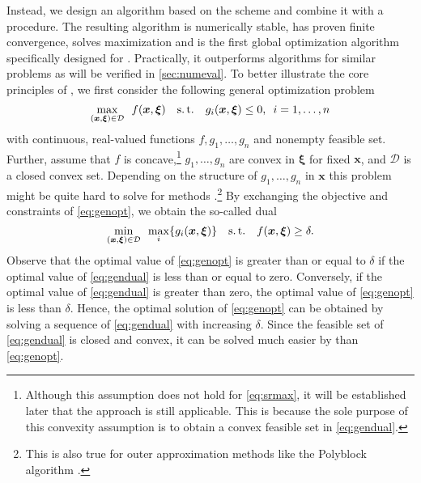 \documentclass[a4paper,10pt,journal]{IEEEtran}
\newcommand{\st}{\mathrm{s.\,t.}}
\let\vec\bm
\begin{document}
Instead, we design an algorithm based on the  scheme \cite{Tuy2005a,Tuy2009,sit,diss} and combine it with a  procedure. The resulting algorithm is numerically stable, has proven finite convergence, solves  maximization and is the first global optimization algorithm specifically designed for . Practically, it outperforms algorithms for similar problems as will be verified in \cref{sec:numeval}.
To better illustrate the core principles of , we first consider the following general optimization problem
\begin{equation} \label{eq:genopt}
	\max_{(\vec x, \vec \xi)\in\mathcal D}\enskip f(\vec x, \vec\xi) \quad\st\quad g_i(\vec x, \vec\xi) \le 0,\enskip i = 1, \dots, n
\end{equation}
with continuous, real-valued functions $f, g_1, \dots, g_n$ and nonempty feasible set. Further, assume that $f$ is concave,\footnote{Although this assumption does not hold for \cref{eq:srmax}, it will be established later that the  approach is still applicable. This is because the sole purpose of this convexity assumption is to obtain a convex feasible set in \cref{eq:gendual}.} $g_1, \dots, g_n$ are convex in $\vec\xi$ for fixed $\vec x$, and $\mathcal D$ is a closed convex set. Depending on the structure of $g_1, \dots, g_n$ in $\vec x$ this problem might be quite hard to solve for  methods \cite{Tuy2016,sit}.\footnote{This is also true for outer approximation methods like the Polyblock algorithm \cite{Tuy2016}.}
By exchanging the objective and constraints of \cref{eq:genopt}, we obtain the so-called  dual
\begin{equation} \label{eq:gendual}
	\min_{(\vec x, \vec\xi)\in\mathcal D}\enskip \max_i\{ g_i(\vec x, \vec\xi) \} \quad\st\quad f(\vec x, \vec\xi)  \ge \delta.
\end{equation}
Observe that the optimal value of \cref{eq:genopt} is greater than or equal to $\delta$ if the optimal value of \cref{eq:gendual} is less than or equal to zero.
Conversely, if the optimal value of \cref{eq:gendual} is greater than zero, the optimal value of \cref{eq:genopt} is less than $\delta$.
Hence, the optimal solution of \cref{eq:genopt} can be obtained by solving a sequence of \cref{eq:gendual} with increasing $\delta$.
Since the feasible set of \cref{eq:gendual} is closed and convex, it can be solved much easier by  than \cref{eq:genopt}.
\end{document}
